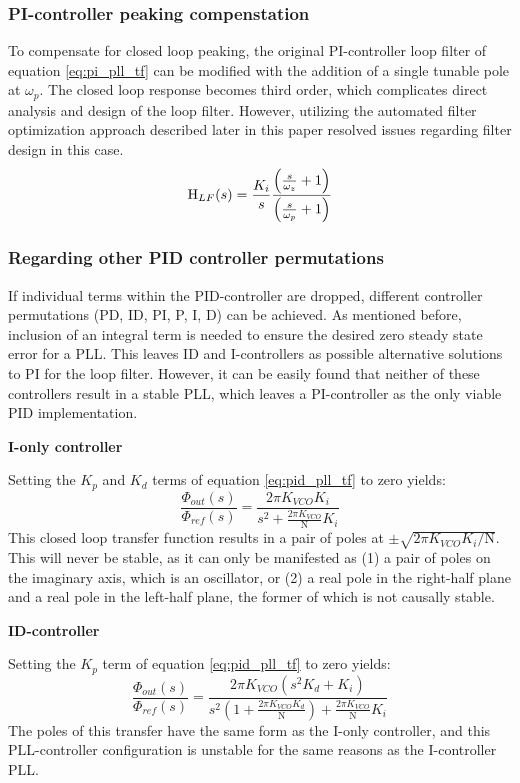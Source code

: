 \subsubsection{PI-controller peaking compenstation}
 To compensate for closed loop peaking, the original PI-controller loop filter of equation \ref{eq:pi_pll_tf} can be modified with the addition of a single tunable pole at $\omega_p$. The closed loop response becomes third order, which complicates direct analysis and design of the loop filter. However, utilizing the automated filter optimization approach described later in this paper resolved issues regarding filter design in this case.
\begin{equation} \label{eq:pi_compensated_tf}
	\textnormal{H}_{LF}(s) = \frac{K_i}{s}\frac{\left(\frac{s}{\omega_z} + 1\right)}{\left(\frac{s}{\omega_p} + 1\right)}
\end{equation}

\subsubsection{Regarding other PID controller permutations} \label{other_pid}
If individual terms within the PID-controller are dropped, different controller permutations (PD, ID, PI, P, I, D) can be achieved. As mentioned before, inclusion of an integral term is needed to ensure the desired zero steady state error for a PLL. This leaves ID and I-controllers as possible alternative solutions to PI for the loop filter. However, it can be easily found that neither of these controllers result in a stable PLL, which leaves a PI-controller as the only viable PID implementation.

\textbf{I-only controller}

Setting the $K_p$ and $K_d$ terms of equation \ref{eq:pid_pll_tf} to zero yields:
\begin{equation}
	\frac{\Phi_{out}(s)}{\Phi_{ref}(s)} = \frac{2\pi K_{VCO}K_i}{s^2 + \frac{2\pi K_{VCO}}{\mathrm{N}}K_i}
\end{equation}
This closed loop transfer function results in a pair of poles at $\pm\sqrt{2\pi K_{VCO}K_i/\mathrm{N}}$. This will never be stable, as it can only be manifested as (1) a pair of poles on the imaginary axis, which is an oscillator, or (2) a real pole in the right-half plane and a real pole in the left-half plane, the former of which is not causally stable.

\textbf{ID-controller}

Setting the $K_p$ term of equation \ref{eq:pid_pll_tf} to zero yields:
\begin{equation}
	\frac{\Phi_{out}(s)}{\Phi_{ref}(s)} = \frac{2\pi K_{VCO}\left(s^2K_d + K_i\right)}{s^2\left(1 + \frac{2\pi K_{VCO}K_d}{\mathrm{N}}\right) + \frac{2\pi K_{VCO}}{\mathrm{N}} K_i}
\end{equation}
The poles of this transfer have the same form as the I-only controller, and this PLL-controller configuration is unstable for the same reasons as the I-controller PLL.